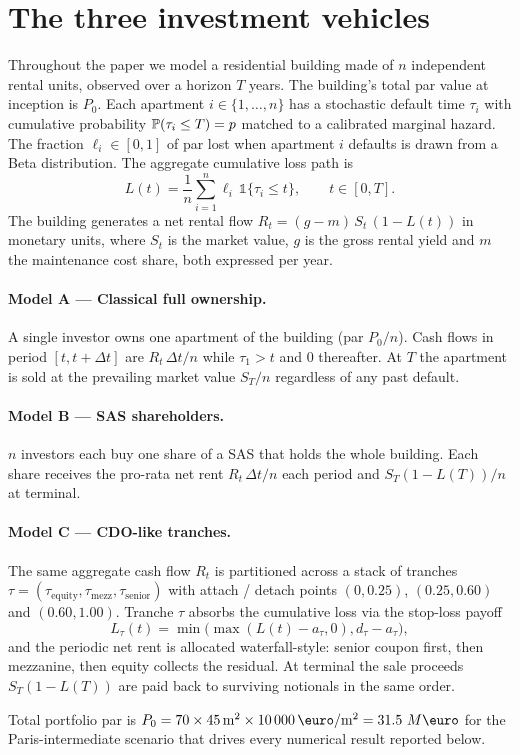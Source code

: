 \section{The three investment vehicles}\label{sec:models}

Throughout the paper we model a residential building made of $n$
independent rental units, observed over a horizon $T$ years. The building's
total par value at inception is $P_0$. Each apartment $i \in \{1, \ldots,
n\}$ has a stochastic default time $\tau_i$ with cumulative probability
$\mathbb{P}(\tau_i \le T) = p$ matched to a calibrated marginal hazard. The
fraction $\ell_i \in [0, 1]$ of par lost when apartment $i$ defaults is
drawn from a Beta distribution. The aggregate cumulative loss path is
\begin{equation}
L(t) = \frac{1}{n}\sum_{i = 1}^{n} \ell_i \,\mathbb{1}\{\tau_i \le t\},
\qquad t \in [0, T].
\label{eq:agg-loss}
\end{equation}
The building generates a net rental flow $R_t = (g - m)\, S_t\,(1 - L(t))$
in monetary units, where $S_t$ is the market value, $g$ is the gross
rental yield and $m$ the maintenance cost share, both expressed per year.

\paragraph{Model A — Classical full ownership.}
A single investor owns one apartment of the building (par $P_0 / n$). Cash
flows in period $[t, t + \Delta t]$ are $R_t\, \Delta t / n$ while
$\tau_1 > t$ and $0$ thereafter. At $T$ the apartment is sold at the
prevailing market value $S_T / n$ regardless of any past default.

\paragraph{Model B — SAS shareholders.}
$n$ investors each buy one share of a SAS that holds the whole building.
Each share receives the pro-rata net rent
$R_t\, \Delta t / n$ each period and $S_T (1 - L(T)) / n$ at terminal.

\paragraph{Model C — CDO-like tranches.}
The same aggregate cash flow $R_t$ is partitioned across a stack of
tranches $\tau = (\tau_\text{equity}, \tau_\text{mezz}, \tau_\text{senior})$
with attach / detach points $(0, 0.25)$, $(0.25, 0.60)$ and $(0.60, 1.00)$.
Tranche $\tau$ absorbs the cumulative loss via the stop-loss payoff
\begin{equation}
L_\tau(t) = \min\bigl(\max(L(t) - a_\tau, 0), d_\tau - a_\tau\bigr),
\label{eq:stop-loss}
\end{equation}
and the periodic net rent is allocated waterfall-style: senior coupon
first, then mezzanine, then equity collects the residual. At terminal the
sale proceeds $S_T (1 - L(T))$ are paid back to surviving notionals in the
same order.

\begin{assumption}\label{ass:par}
Total portfolio par is $P_0 = \nObligors \times 45\,\text{m}^2 \times
10\,000\,\EUR / \text{m}^2 = \parTotal$ for the Paris-intermediate scenario
that drives every numerical result reported below.
\end{assumption}
